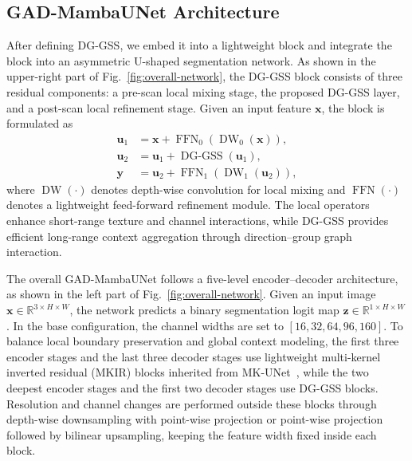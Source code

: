 \subsection{GAD-MambaUNet Architecture}

After defining DG-GSS, we embed it into a lightweight block and integrate the block into an asymmetric U-shaped segmentation network. As shown in the upper-right part of Fig.~\ref{fig:overall-network}, the DG-GSS block consists of three residual components: a pre-scan local mixing stage, the proposed DG-GSS layer, and a post-scan local refinement stage. Given an input feature $\mathbf{x}$, the block is formulated as
\begin{equation}
\begin{aligned}
\mathbf{u}_1 &= \mathbf{x}+\operatorname{FFN}_0(\operatorname{DW}_0(\mathbf{x})), \\
\mathbf{u}_2 &= \mathbf{u}_1+\operatorname{DG\text{-}GSS}(\mathbf{u}_1), \\
\mathbf{y} &= \mathbf{u}_2+\operatorname{FFN}_1(\operatorname{DW}_1(\mathbf{u}_2)),
\end{aligned}
\end{equation}
where $\operatorname{DW}(\cdot)$ denotes depth-wise convolution for local mixing and $\operatorname{FFN}(\cdot)$ denotes a lightweight feed-forward refinement module. The local operators enhance short-range texture and channel interactions, while DG-GSS provides efficient long-range context aggregation through direction--group graph interaction.

The overall GAD-MambaUNet follows a five-level encoder--decoder architecture, as shown in the left part of Fig.~\ref{fig:overall-network}. Given an input image $\mathbf{x}\in\mathbb{R}^{3\times H\times W}$, the network predicts a binary segmentation logit map $\mathbf{z}\in\mathbb{R}^{1\times H\times W}$. In the base configuration, the channel widths are set to $[16,32,64,96,160]$. To balance local boundary preservation and global context modeling, the first three encoder stages and the last three decoder stages use lightweight multi-kernel inverted residual (MKIR) blocks inherited from MK-UNet~\cite{rahman2025mkunet}, while the two deepest encoder stages and the first two decoder stages use DG-GSS blocks. Resolution and channel changes are performed outside these blocks through depth-wise downsampling with point-wise projection or point-wise projection followed by bilinear upsampling, keeping the feature width fixed inside each block.

